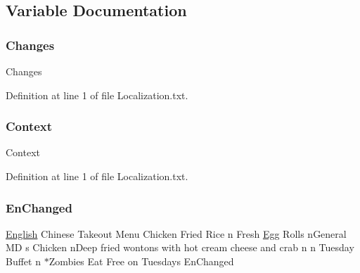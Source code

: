 \subsection{Variable Documentation}
\mbox{\label{_dishong_01_tower_01_challenge_2_config_2_localization_8txt_aada75e543d2eadaa69533d17cac8bd9a}} 
\subsubsection{\texorpdfstring{Changes}{Changes}}
{\footnotesize\ttfamily Changes}



Definition at line 1 of file Localization.\+txt.

\mbox{\label{_dishong_01_tower_01_challenge_2_config_2_localization_8txt_abbebfae2c8b3c06e3115e79965277840}} 
\subsubsection{\texorpdfstring{Context}{Context}}
{\footnotesize\ttfamily Context}



Definition at line 1 of file Localization.\+txt.

\mbox{\label{_dishong_01_tower_01_challenge_2_config_2_localization_8txt_a279622364c8fda27d2ce2e3f8b02ff5f}} 
\subsubsection{\texorpdfstring{EnChanged}{EnChanged}}
{\footnotesize\ttfamily \mbox{\hyperlink{_sphere_i_i_01_winter_01_project_2_config_2_localization_8txt_ad896b63205779b1b09e86d941ce13976}{English}} Chinese Takeout Menu Chicken Fried Rice n Fresh \mbox{\hyperlink{_sphere_i_i_01_winter_01_project_2_config_2_localization_8txt_a55334ab0b48a68a93004334728020f15}{Egg}} Rolls n\+General MD s Chicken n\+Deep fried wontons with hot cream cheese and crab n n Tuesday Buffet n $\ast$Zombies Eat Free on Tuesdays En\+Changed}



